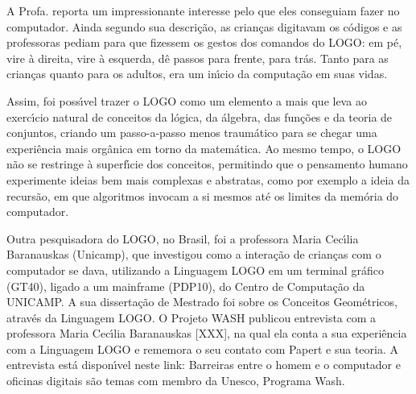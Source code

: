 \documentclass[
12pt,		%
openright,	%
twoside,  %
a4paper,			%
chapter=TITLE,		%
english,			%
french,				%
spanish,			%
brazil				%
]{USPSC-classe/USPSC}
\begin{document}
A Profa. reporta um impressionante interesse pelo que eles conseguiam fazer no computador. Ainda segundo sua descri\c{c}\~ao, as crian\c{c}as digitavam  os c\'odigos e as professoras pediam para que fizessem os gestos dos comandos do LOGO: \textquotedbl em p\'e\textquotedbl , \textquotedbl vire \`a direita\textquotedbl , \textquotedbl vire \`a esquerda\textquotedbl , \textquotedbl d\^e passos para frente\textquotedbl , \textquotedbl para tr\'as\textquotedbl . Tanto para as crian\c{c}as quanto para os adultos, era um in\'{\i}cio da computa\c{c}\~ao em suas vidas.














Assim, foi poss\'{\i}vel trazer o LOGO como um elemento a mais que leva ao exerc\'{\i}cio natural de conceitos da l\'ogica, da \'algebra, das fun\c{c}\~oes e da teoria de conjuntos, criando um passo-a-passo menos traum\'atico para se chegar uma experi\^encia mais org\^anica em torno da matem\'atica. Ao mesmo tempo, o LOGO n\~ao se restringe \`a superf\'{\i}cie dos conceitos, permitindo que o pensamento humano experimente ideias bem mais complexas e abstratas, como por exemplo a ideia da recurs\~ao, em que algoritmos invocam a si mesmos at\'e os limites da mem\'oria do computador.














Outra pesquisadora do LOGO, no Brasil, foi a professora Maria Cec\'{\i}lia Baranauskas (Unicamp), que investigou como a intera\c{c}\~ao de crian\c{c}as com o computador se dava, utilizando a Linguagem LOGO em um terminal gr\'afico (GT40), ligado a um mainframe (PDP10), do Centro de Computa\c{c}\~ao da UNICAMP. A sua disserta\c{c}\~ao de Mestrado foi sobre os \textquotedbl Conceitos Geom\'etricos, atrav\'es da Linguagem LOGO\textquotedbl . O Projeto WASH publicou entrevista com a professora Maria Cec\'{\i}lia Baranauskas [XXX], na qual ela conta a sua experi\^encia com a Linguagem LOGO e rememora o seu contato com Papert e sua teoria. A entrevista est\'a dispon\'{\i}vel neste link: \textquotedbl Barreiras entre o homem e o computador e oficinas digitais s\~ao temas com membro da Unesco, Programa Wash\textquotedbl .
\end{document}
